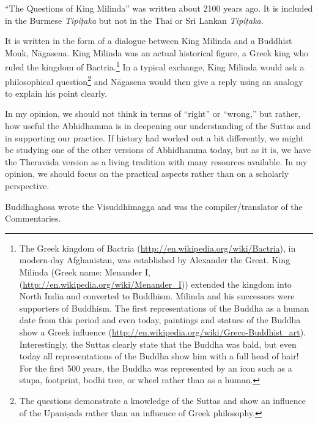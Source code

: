 “The Questions of King Milinda” was written about 2100 years ago. It is included in the Burmese \textit{Tipiṭaka} but not in the Thai or Sri Lankan \textit{Tipiṭaka}.

It is written in the form of a dialogue between King Milinda and a Buddhist Monk, Nāgasena. King Milinda was an actual historical figure, a Greek king who ruled the kingdom of Bactria.\footnote{The Greek kingdom of Bactria (\url{http://en.wikipedia.org/wiki/Bactria}), in modern-day Afghanistan, was established by Alexander the Great. King Milinda (Greek name: Menander I, (\url{http://en.wikipedia.org/wiki/Menander_I})) extended the kingdom into North India and converted to Buddhism. Milinda and his successors were supporters of Buddhism. The first representations of the Buddha as a human date from this period and even today, paintings and statues of the Buddha show a Greek influence (\url{http://en.wikipedia.org/wiki/Greco-Buddhist_art}). Interestingly, the Suttas clearly state that the Buddha was bald, but even today all representations of the Buddha show him with a full head of hair! For the first 500 years, the Buddha was represented by an icon such as a stupa, footprint, bodhi tree, or wheel rather than as a human.} In a typical exchange, King Milinda would ask a philosophical question\footnote{The questions demonstrate a knowledge of the Suttas and show an influence of the Upaniṣads rather than an influence of Greek philosophy.} and Nāgasena would then give a reply using an analogy to explain his point clearly. 


In my opinion, we should not think in terms of “right” or “wrong,” but rather, how useful the Abhidhamma is in deepening our understanding of the Suttas and in supporting our practice. If history had worked out a bit differently, we might be studying one of the other versions of Abhidhamma today, but as it is, we have the Theravāda version as a living tradition with many resources available. In my opinion, we should focus on the practical aspects rather than on a scholarly perspective.


Buddhaghosa wrote the Visuddhimagga and was the compiler/translator of the Commentaries.

